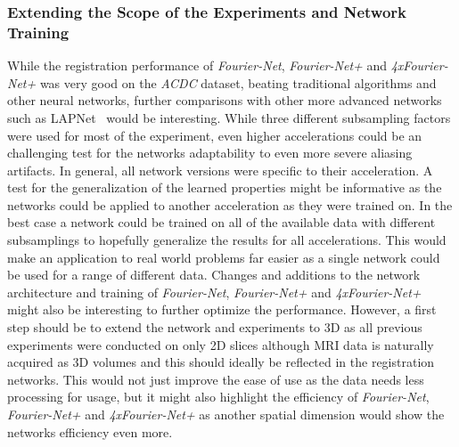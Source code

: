 \subsubsection{Extending the Scope of the Experiments and Network Training} \label{SubSubSec:ExtendingScopeExperimentsNetworkTraining}
While the registration performance of \emph{Fourier-Net}, \emph{Fourier-Net+} and \emph{4xFourier-Net+} was very good on the \emph{ACDC} dataset, beating traditional algorithms and other neural networks, further comparisons with other more advanced networks such as LAPNet~\cite{LAPNet} would be interesting. While three different subsampling factors were used for most of the experiment, even higher accelerations could be an challenging test for the networks adaptability to even more severe aliasing artifacts. In general, all network versions were specific to their acceleration. A test for the generalization of the learned properties might be informative as the networks could be applied to another acceleration as they were trained on. In the best case a network could be trained on all of the available data with different subsamplings to hopefully generalize the results for all accelerations. This would make an application to real world problems far easier as a single network could be used for a range of different data. Changes and additions to the network architecture and training of \emph{Fourier-Net}, \emph{Fourier-Net+} and \emph{4xFourier-Net+} might also be interesting to further optimize the performance. However, a first step should be to extend the network and experiments to 3D as all previous experiments were conducted on only 2D slices although MRI data is naturally acquired as 3D volumes and this should ideally be reflected in the registration networks. This would not just improve the ease of use as the data needs less processing for usage, but it might also highlight the efficiency of \emph{Fourier-Net}, \emph{Fourier-Net+} and \emph{4xFourier-Net+} as another spatial dimension would show the networks efficiency even more.

